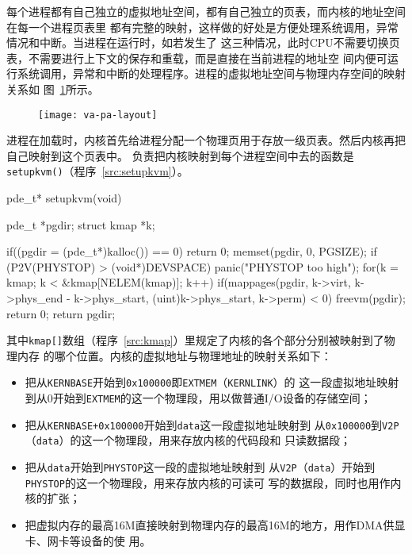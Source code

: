 \documentclass{swfcthesismscctex}
\begin{document}
每个进程都有自己独立的虚拟地址空间，都有自己独立的页表，而内核的地址空间在每一个进程页表里
都有完整的映射，这样做的好处是方便处理系统调用，异常情况和中断。当进程在运行时，如若发生了
这三种情况，此时CPU不需要切换页表，不需要进行上下文的保存和重载，而是直接在当前进程的地址空
间内便可运行系统调用，异常和中断的处理程序。进程的虚拟地址空间与物理内存空间的映射关系如
图~\ref{fig:va-pa-layout}所示。

\begin{figure}[!ht]
  \centering
  \texttt{[image: va-pa-layout]}
  \label{fig:va-pa-layout}
\end{figure}

进程在加载时，内核首先给进程分配一个物理页用于存放一级页表。然后内核再把自己映射到这个页表中。
负责把内核映射到每个进程空间中去的函数是\texttt{setupkvm()}（程序~\ref{src:setupkvm}）。

\begin{listing}%
  \begin{codeblock}
\begin{ccode}
pde_t* setupkvm(void) {
  pde_t *pgdir;
  struct kmap *k;

  if((pgdir = (pde_t*)kalloc()) == 0)
    return 0;
  memset(pgdir, 0, PGSIZE);
  if (P2V(PHYSTOP) > (void*)DEVSPACE)
    panic("PHYSTOP too high");
  for(k = kmap; k < &kmap[NELEM(kmap)]; k++)
    if(mappages(pgdir, k->virt, k->phys_end - k->phys_start, (uint)k->phys_start, k->perm) < 0)    
    {    
      freevm(pgdir);
      return 0;
    }
  return pgdir;
}
\end{ccode}
  \end{codeblock}
  \label{src:setupkvm}
\end{listing}

其中\texttt{kmap[]}数组（程序~\ref{src:kmap}）里规定了内核的各个部分分别被映射到了物理内存
的哪个位置。内核的虚拟地址与物理地址的映射关系如下：
\begin{itemize}
\item 把从\texttt{KERNBASE}开始到\texttt{0x100000}即\texttt{EXTMEM}（\texttt{KERNLINK}）的
  这一段虚拟地址映射到从0开始到\texttt{EXTMEM}的这一个物理段，用以做普通I/O设备的存储空间；
\item 把从\texttt{KERNBASE+0x100000}开始到\texttt{data}这一段虚拟地址映射到
  从\texttt{0x100000}到\texttt{V2P}（\texttt{data}）的这一个物理段，用来存放内核的代码段和
  只读数据段；
\item 把从\texttt{data}开始到\texttt{PHYSTOP}这一段的虚拟地址映射到
  从\texttt{V2P}（\texttt{data}）开始到\texttt{PHYSTOP}的这一个物理段，用来存放内核的可读可
  写的数据段，同时也用作内核的扩张；
\item 把虚拟内存的最高16M直接映射到物理内存的最高16M的地方，用作DMA供显卡、网卡等设备的使
  用。
\end{itemize}
\end{document}
